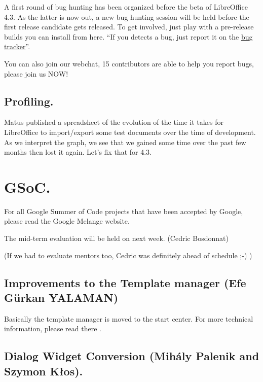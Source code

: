 \documentclass{article}
\begin{document}
A first round of bug hunting has been organized before the beta of LibreOffice 4.3. As the latter is now out, a new bug hunting session will be held before the first release candidate gets released. To get involved, just play with a pre-release builds you can install from here\cite{preReleaseLink}. ``If you detects a bug, just report it on the \href{https://www.libreoffice.org/get-help/bug}{bug tracker}''\cite{bugHuntingRc11}\cite{bugHuntingRc12}.

You can also join our webchat, 15 contributors are able to help you report bugs, please join us NOW!\cite{qaWebchat}

\subsection{Profiling.}

Matus published a spreadsheet of the evolution of the time it takes for LibreOffice to import/export some test documents over the time of development. As we interpret the graph, we see that we gained some time over the past few months then lost it again. Let's fix that for 4.3.\cite{profiling} 



\section{GSoC.}

For all Google Summer of Code projects that have been accepted by Google, please read the Google Melange website\cite{gsocLink}.

The mid-term evaluation will be held on next week. (Cedric Bosdonnat)

(If we had to evaluate mentors too, Cedric was definitely ahead of schedule ;-) \cite{gsocMidTermEval})

\subsection{Improvements to the Template manager (Efe Gürkan YALAMAN)}

Basically the template manager is moved to the start center. For more technical information, please read there \cite{gsocTemplateManager}.

\subsection{Dialog Widget Conversion (Mihály Palenik and Szymon Kłos).}
\end{document}
